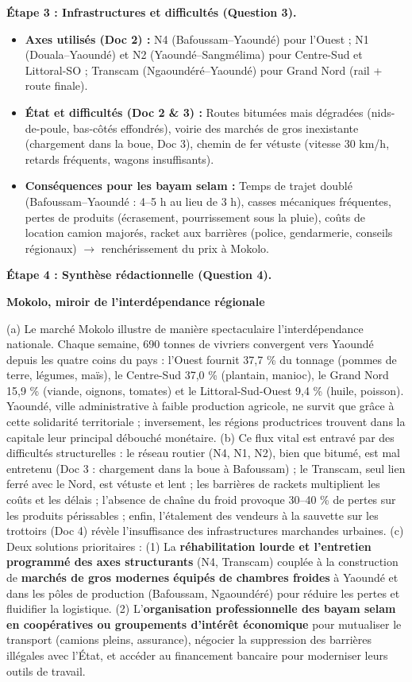 \documentclass[11pt]{article}
\begin{document}
\begin{exoresolu}
\textbf{Étape 3 : Infrastructures et difficultés (Question 3).}\par
\begin{itemize}
\item \textbf{Axes utilisés (Doc 2) :} N4 (Bafoussam--Yaoundé) pour l'Ouest ; N1 (Douala--Yaoundé) et N2 (Yaoundé--Sangmélima) pour Centre-Sud et Littoral-SO ; Transcam (Ngaoundéré--Yaoundé) pour Grand Nord (rail + route finale).
\item \textbf{État et difficultés (Doc 2 \& 3) :} Routes bitumées mais dégradées (nids-de-poule, bas-côtés effondrés), voirie des marchés de gros inexistante (chargement dans la boue, Doc 3), chemin de fer vétuste (vitesse 30 km/h, retards fréquents, wagons insuffisants).
\item \textbf{Conséquences pour les bayam selam :} Temps de trajet doublé (Bafoussam--Yaoundé : 4--5 h au lieu de 3 h), casses mécaniques fréquentes, pertes de produits (écrasement, pourrissement sous la pluie), coûts de location camion majorés, racket aux barrières (police, gendarmerie, conseils régionaux) $\rightarrow$ renchérissement du prix à Mokolo.
\end{itemize}

\textbf{Étape 4 : Synthèse rédactionnelle (Question 4).}\par
\textbf{Mokolo, miroir de l'interdépendance régionale}\par
(a) Le marché Mokolo illustre de manière spectaculaire l'interdépendance nationale. Chaque semaine, 690 tonnes de vivriers convergent vers Yaoundé depuis les quatre coins du pays : l'Ouest fournit 37,7 \% du tonnage (pommes de terre, légumes, maïs), le Centre-Sud 37,0 \% (plantain, manioc), le Grand Nord 15,9 \% (viande, oignons, tomates) et le Littoral-Sud-Ouest 9,4 \% (huile, poisson). Yaoundé, ville administrative à faible production agricole, ne survit que grâce à cette solidarité territoriale ; inversement, les régions productrices trouvent dans la capitale leur principal débouché monétaire. (b) Ce flux vital est entravé par des difficultés structurelles : le réseau routier (N4, N1, N2), bien que bitumé, est mal entretenu (Doc 3 : chargement dans la boue à Bafoussam) ; le Transcam, seul lien ferré avec le Nord, est vétuste et lent ; les barrières de rackets multiplient les coûts et les délais ; l'absence de chaîne du froid provoque 30--40 \% de pertes sur les produits périssables ; enfin, l'étalement des vendeurs à la sauvette sur les trottoirs (Doc 4) révèle l'insuffisance des infrastructures marchandes urbaines. (c) Deux solutions prioritaires : (1) La \textbf{réhabilitation lourde et l'entretien programmé des axes structurants} (N4, Transcam) couplée à la construction de \textbf{marchés de gros modernes équipés de chambres froides} à Yaoundé et dans les pôles de production (Bafoussam, Ngaoundéré) pour réduire les pertes et fluidifier la logistique. (2) L'\textbf{organisation professionnelle des bayam selam en coopératives ou groupements d'intérêt économique} pour mutualiser le transport (camions pleins, assurance), négocier la suppression des barrières illégales avec l'État, et accéder au financement bancaire pour moderniser leurs outils de travail.


\end{exoresolu}
\end{document}
